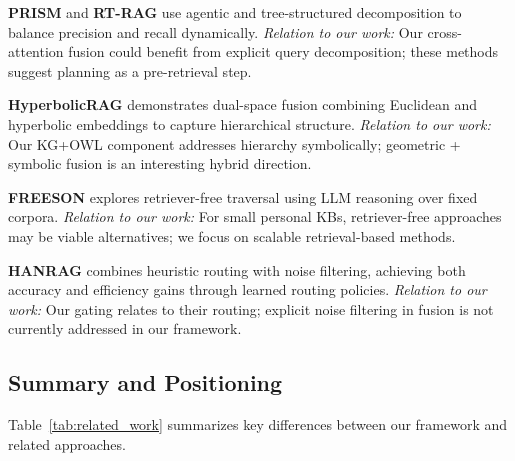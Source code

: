 \documentclass[11pt,a4paper]{article}
\begin{document}
\textbf{PRISM} \citep{prism2025} and \textbf{RT-RAG} \citep{rtrag2026} use agentic and tree-structured decomposition to balance precision and recall dynamically. \textit{Relation to our work:} Our cross-attention fusion could benefit from explicit query decomposition; these methods suggest planning as a pre-retrieval step.

\textbf{HyperbolicRAG} \citep{hyprag2025} demonstrates dual-space fusion combining Euclidean and hyperbolic embeddings to capture hierarchical structure. \textit{Relation to our work:} Our KG+OWL component addresses hierarchy symbolically; geometric + symbolic fusion is an interesting hybrid direction.

\textbf{FREESON} \citep{freeson2025} explores retriever-free traversal using LLM reasoning over fixed corpora. \textit{Relation to our work:} For small personal KBs, retriever-free approaches may be viable alternatives; we focus on scalable retrieval-based methods.

\textbf{HANRAG} \citep{hanrag2025} combines heuristic routing with noise filtering, achieving both accuracy and efficiency gains through learned routing policies. \textit{Relation to our work:} Our gating relates to their routing; explicit noise filtering in fusion is not currently addressed in our framework.

\subsection{Summary and Positioning}

Table~\ref{tab:related_work} summarizes key differences between our framework and related approaches.
\end{document}
